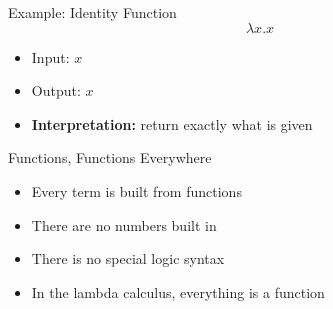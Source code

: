 \documentclass{beamer}
\begin{document}
\begin{frame}{Example: Identity Function}
  \[\lambda x.x\]
  \begin{itemize}
    \item Input: $x$
    \item Output: $x$
    \item \textbf{Interpretation:} return exactly what is given
  \end{itemize}
\end{frame}
\begin{frame}{Functions, Functions Everywhere}
  \begin{itemize}
    \item Every term is built from functions
    \item There are no numbers built in
    \item There is no special logic syntax
    \item In the lambda calculus, everything is a function
  \end{itemize}
\end{frame}
\end{document}
